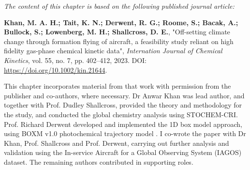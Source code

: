 \textit{The content of this chapter is based on the following published journal article:}

\textbf{Khan, M. A. H.; Tait, K. N.; Derwent, R. G.; Roome, S.; Bacak, A.; Bullock, S.; Lowenberg, M. H.; Shallcross, D. E.}, "Off-setting climate change through formation flying of aircraft, a feasibility study reliant on high fidelity gas-phase chemical kinetic data", \textit{Internation Journal of Chemical Kinetics}, vol. 55, no. 7, pp. 402--412, 2023. DOI: \url{https://doi.org/10.1002/kin.21644}.

This chapter incorporates material from that work with permission from the publisher and co-authors, where necessary. Dr Anwar Khan was lead author, and together with Prof. Dudley Shallcross, provided the theory and methodology for the study, and conducted the global chemistry analysis using STOCHEM-CRI. Prof. Richard Derwent developed and implemented the 1D box model approach, using BOXM v1.0 photochemical trajectory model \cite{Derwent2010}. I co-wrote the paper with Dr Khan, Prof. Shallcross and Prof. Derwent, carrying out further analysis and validation using the In-service Aircraft for a Global Observing System (IAGOS) dataset. The remaining authors contributed in supporting roles.







